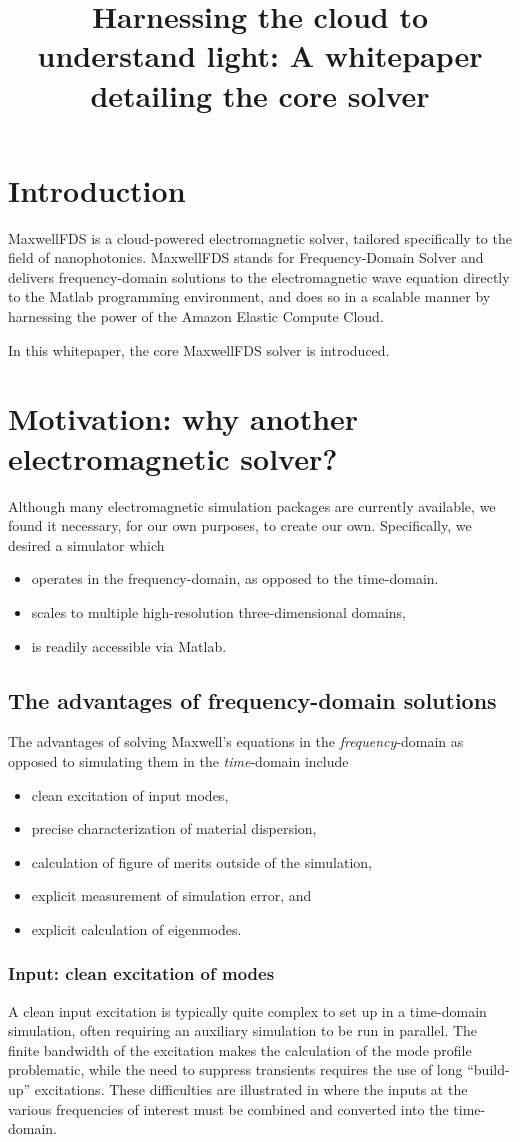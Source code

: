 \documentclass{article}
\title{Harnessing the cloud to understand light: 
        A whitepaper detailing the \MaxwellFDS core solver}
\newcommand{\MaxwellFDS}{MaxwellFDS }
\newcommand{\BI}{\begin{itemize}\item}
\newcommand{\EI}{\end{itemize}}
\newcommand{\I}{\item}
\begin{document}
\maketitle
\tableofcontents

\section*{Introduction}
\MaxwellFDS is a cloud-powered electromagnetic solver,
    tailored specifically to the field of nanophotonics.
\MaxwellFDS stands for Frequency-Domain Solver
    and delivers frequency-domain solutions to the electromagnetic wave equation
    directly to the Matlab programming environment,
    and does so in a scalable manner by harnessing the power
    of the Amazon Elastic Compute Cloud.

In this whitepaper, the core \MaxwellFDS solver is introduced.


\section{Motivation: why another electromagnetic solver?}
Although many electromagnetic simulation packages are currently available,
    we found it necessary, for our own purposes, to create our own.
Specifically, we desired a simulator which 
    \BI operates in the frequency-domain, as opposed to the time-domain.
    \I  scales to multiple high-resolution three-dimensional domains,
    \I  is readily accessible via Matlab. \EI

\subsection{The advantages of frequency-domain solutions}
The advantages of solving Maxwell's equations in the  \emph{frequency}-domain 
    as opposed to simulating them in the \emph{time}-domain include
    \BI clean excitation of input modes,
    \I  precise characterization of material dispersion,
    \I  calculation of figure of merits outside of the simulation,
    \I  explicit measurement of simulation error, and
    \I  explicit calculation of eigenmodes. \EI

\subsubsection{Input: clean excitation of modes}
A clean input excitation is typically quite complex to set up
    in a time-domain simulation,
    often requiring an auxiliary simulation to be run in parallel.
The finite bandwidth of the excitation makes the calculation
    of the mode profile problematic, while
    the need to suppress transients requires the use of 
    long ``build-up'' excitations.
These difficulties are illustrated in 
    where the inputs at the various frequencies of interest
    must be combined and converted into the time-domain.
\end{document}
